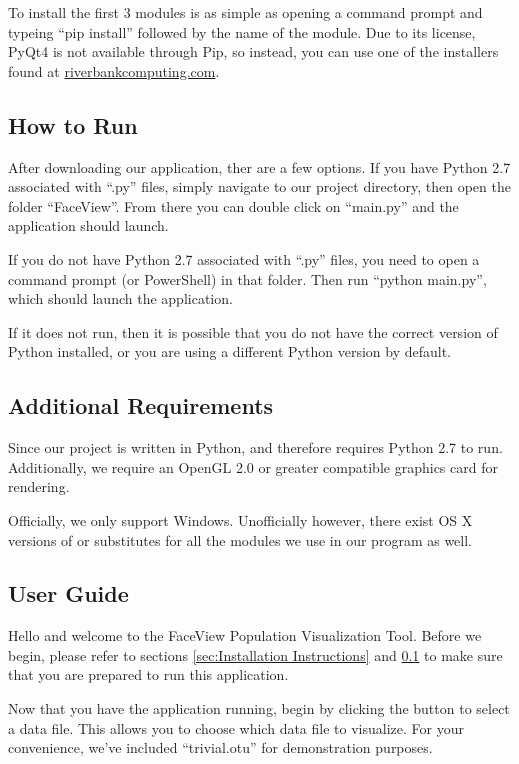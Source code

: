 \documentclass[letterpaper,10pt, onecolumn, draftclsnofoot]{IEEEtran}
\begin{document}
To install the first 3 modules is as simple as opening a command prompt and typeing ``pip install'' followed by the name of the module. Due to its license, PyQt4 is not available through Pip, so instead, you can use one of the installers found at \href{https://www.riverbankcomputing.com/software/pyqt/download}{riverbankcomputing.com}.

\subsection{How to Run}
\label{sec:How to Run}

After downloading our application, ther are a few options. If you have Python 2.7 associated with ``.py'' files, simply navigate to our project directory, then open the folder ``FaceView''. From there you can double click on ``main.py'' and the application should launch.

If you do not have Python 2.7 associated with ``.py'' files, you need to open a command prompt (or PowerShell) in that folder. Then run ``python main.py'', which should launch the application.

If it does not run, then it is possible that you do not have the correct version of Python installed, or you are using a different Python version by default.

\subsection{Additional Requirements}
Since our project is written in Python, and therefore requires Python 2.7 to run. Additionally, we require an OpenGL 2.0 or greater compatible graphics card for rendering.

Officially, we only support Windows. Unofficially however, there exist OS X versions of or substitutes for all the modules we use in our program as well.

\subsection{User Guide}
Hello and welcome to the FaceView Population Visualization Tool. Before we begin, please refer to sections \ref{sec:Installation Instructions} and \ref{sec:How to Run} to make sure that you are prepared to run this application.

Now that you have the application running, begin by clicking the button to select a data file. This allows you to choose which data file to visualize. For your convenience, we've included ``trivial.otu'' for demonstration purposes.
\end{document}
